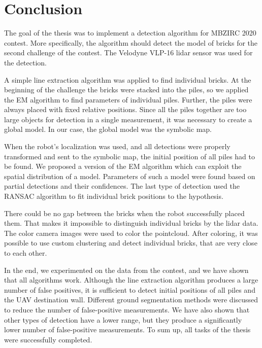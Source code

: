 \chapter{Conclusion}
\label{ch:conclusion}
The goal of the thesis was to implement a detection algorithm for MBZIRC 2020 contest. More specifically, the algorithm should detect the model of bricks for the second challenge of the contest. The Velodyne VLP-16 lidar sensor was used for the detection. 

A simple line extraction algorithm was applied to find individual bricks. At the beginning of the challenge the bricks were stacked into the piles, so we applied the EM algorithm to find parameters of individual piles. Further, the piles were always placed with fixed relative positions. Since all the piles together are too large objects for detection in a single measurement, it was necessary to create a global model. In our case, the global model was the symbolic map.

When the robot's localization was used, and all detections were properly transformed and sent to the symbolic map, the initial position of all piles had to be found. We proposed a version of the EM algorithm which can exploit the spatial distribution of a model. Parameters of such a model were found based on partial detections and their confidences. The last type of detection used the RANSAC algorithm to fit individual brick positions to the hypothesis.

There could be no gap between the bricks when the robot successfully placed them. That makes it impossible to distinguish individual bricks by the lidar data. The color camera images were used to color the pointcloud. After coloring, it was possible to use custom clustering and detect individual bricks, that are very close to each other.

In the end, we experimented on the data from the contest, and we have shown that all algorithms work. Although the line extraction algorithm produces a large number of false positives, it is sufficient to detect initial positions of all piles and the UAV destination wall. Different ground segmentation methods were discussed to reduce the number of false-positive measurements. We have also shown that other types of detection have a lower range, but they produce a significantly lower number of false-positive measurements. To sum up, all tasks of the thesis were successfully completed.